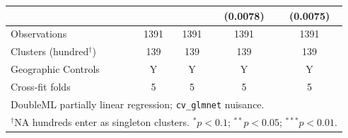 \begin{table}[H]
\begin{tabular}{lcccc}
 &  &  & (0.0078) & (0.0075) \\
\hline
Observations & 1391 & 1391 & 1391 & 1391 \\
Clusters (hundred$^\dagger$) & 139 & 139 & 139 & 139 \\
Geographic Controls & Y & Y & Y & Y \\
Cross-fit folds & 5 & 5 & 5 & 5 \\
\hline\hline
\multicolumn{5}{l}{\footnotesize DoubleML partially linear regression; \texttt{cv\_glmnet} nuisance.} \\
\multicolumn{5}{l}{\footnotesize $^\dagger$NA hundreds enter as singleton clusters. $^{*}p<0.1$; $^{**}p<0.05$; $^{***}p<0.01$.} \\
\end{tabular}
\end{table}
